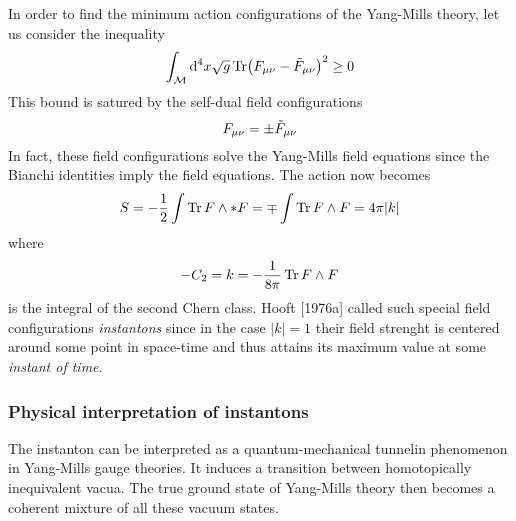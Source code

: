 In order to find the minimum action configurations of the Yang-Mills theory, let us consider the inequality
\begin{equation}
  \int_{\mathcal{M}}\dd^4x\sqrt{g}\Tr(F_{\mu\nu }-\tilde{F}_{\mu\nu })^2\geq 0
\end{equation}
This bound is satured by the self-dual field configurations
\begin{equation}
  F_{\mu\nu }=\pm \tilde{F}_{\mu\nu }
\end{equation}
In fact, these field configurations solve the Yang-Mills field equations since the Bianchi identities imply the field equations. The action now becomes
\begin{equation}
  S=-\frac{1}{2}\int \Tr F\wedge *F=\mp \int\Tr F\wedge F=4\pi |k|
\end{equation}
where
\begin{equation}
  -C_2=k=-\frac{1}{8\pi }\Tr F\wedge F
\end{equation}
is the integral of the second Chern class. Hooft [1976a] called such special field configurations \textit{instantons} since in the case $|k|=1$ their field strenght is centered around some point in space-time and thus attains its maximum value at some \textit{instant of time}.

\subsubsection{Physical interpretation of instantons}
The instanton can be interpreted as a quantum-mechanical tunnelin phenomenon in Yang-Mills gauge theories. It induces a transition between homotopically inequivalent vacua. The true ground state of Yang-Mills theory then becomes a coherent mixture of all these vacuum states.


